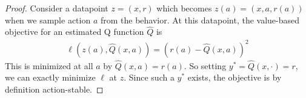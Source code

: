 \label{app:stable}

\vbstable*

\begin{proof}
Consider a datapoint $ z= (x,r)$ which becomes $ z(a) = (x, a, r(a))$ when we sample action $ a$ from the behavior. At this datapoint, the value-based objective for an estimated Q function $ \hat Q$ is
\begin{align}
    \ell(z(a), \hat Q(x, a)) = (r(a) - \hat Q(x,a))^2
\end{align}
This is minimized at all $ a $ by $\hat Q(x,a) = r(a)$. So setting $ y^* = \hat Q(x, \cdot) = r$, we can exactly minimize $ \ell$ at $ z$. Since such a $ y^*$ exists, the objective is by definition action-stable.
\end{proof}



\pbstable*

